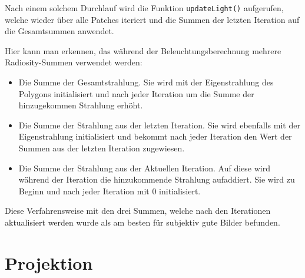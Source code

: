 \documentclass[final,a4paper,11pt,notitlepage,halfparskip]{scrreprt}
\begin{document}
Nach einem solchem Durchlauf wird die Funktion \texttt{updateLight()}
aufgerufen, welche wieder über alle Patches iteriert und die Summen der letzten
Iteration auf die Gesamtsummen anwendet.

Hier kann man erkennen, das während der Beleuchtungsberechnung mehrere
Radiosity-Summen verwendet werden:
\begin{itemize}
  \item Die Summe der Gesamtstrahlung. Sie wird mit der Eigenstrahlung des
    Polygons initialisiert und nach jeder Iteration um die Summe der
    hinzugekommen Strahlung erhöht.
  \item Die Summe der Strahlung aus der letzten Iteration. Sie wird ebenfalls
    mit der Eigenstrahlung initialisiert und bekommt nach jeder Iteration den
    Wert der Summen aus der letzten Iteration zugewiesen.
  \item Die Summe der Strahlung aus der Aktuellen Iteration. Auf diese wird
    während der Iteration die hinzukommende Strahlung aufaddiert. Sie wird zu
    Beginn und nach jeder Iteration mit $0$ initialisiert.
\end{itemize}
Diese Verfahrensweise mit den drei Summen, welche nach den Iterationen
aktualisiert werden wurde als am besten für subjektiv gute Bilder befunden.

\section{Projektion}\label{sec:proj}
\end{document}
